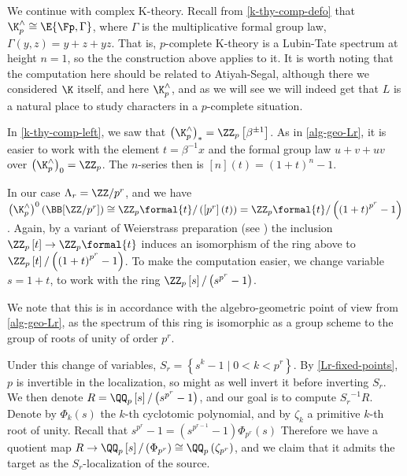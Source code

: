 \begin{example}\label{k-thy-Lr}
	We continue with complex K-theory.
	Recall from \ref{k-thy-comp-defo} that $\K_p^\wedge \cong \E{\Fp, \Gamma}$, where $\Gamma$ is the multiplicative formal group law, $\Gamma\left(y,z\right) = y + z + yz$.
	That is, $p$-complete K-theory is a Lubin-Tate spectrum at height $n = 1$, so the the construction above applies to it.
	It is worth noting that the computation here should be related to Atiyah-Segal, although there we considered $\K$ itself, and here $\K_p^\wedge$, and as we will see we will indeed get that $L$ is a natural place to study characters in a $p$-complete situation.
	
	In \ref{k-thy-comp-left}, we saw that $\left(\K_p^\wedge\right)_* = \ZZ_p\left[\beta^{\pm 1}\right]$.
	As in \ref{alg-geo-Lr}, it is easier to work with the element $t = \beta^{-1} x$ and the formal group law $u + v + uv$ over $\left(\K_p^\wedge\right)_0 = \ZZ_p$.
	The $n$-series then is $\left[n\right]\left(t\right) = \left(1 + t\right)^n - 1$.
	
	In our case $\Lambda_r = \ZZ/p^r$, and we have
	$
	\left(\K_p^\wedge\right)^0\left(\BB[\ZZ/p^r]\right)
	\cong \ZZ_p\formal{t}/\left(\left[p^r\right]\left(t\right)\right)
	= \ZZ_p\formal{t}/\left(\left(1 + t\right)^{p^r} - 1\right)
	$.
	Again, by a variant of Weierstrass preparation (see \cite[5.1]{HKR}) the inclusion $\ZZ_p\left[t\right] \to \ZZ_p\formal{t}$ induces an isomorphism of the ring above to 	$\ZZ_p\left[t\right]/\left(\left(1 + t\right)^{p^r} - 1\right)$.
	To make the computation easier, we change variable $s = 1+t$, to work with the ring
	$\ZZ_p\left[s\right]/\left(s^{p^r} - 1\right)$.
	
	We note that this is in accordance with the algebro-geometric point of view from \ref{alg-geo-Lr}, as the spectrum of this ring is isomorphic as a group scheme to the group of roots of unity of order $p^r$.
	
	Under this change of variables, $S_r = \left\{s^k - 1 \mid 0 < k < p^r\right\}$.
	By \ref{Lr-fixed-points}, $p$ is invertible in the localization, so might as well invert it before inverting $S_r$.
	We then denote $R = \QQ_p\left[s\right]/\left(s^{p^r} - 1\right)$, and our goal is to compute ${S_r}^{-1} R$.
	Denote by $\Phi_k\left(s\right)$ the $k$-th cyclotomic polynomial, and by $\zeta_k$ a primitive $k$-th root of unity.
	Recall that $s^{p^r} - 1 = \left(s^{p^{r-1}} - 1\right) \Phi_{p^r}\left(s\right)$
	Therefore we have a quotient map $R \to \QQ_p\left[s\right]/\left(\Phi_{p^r}\right) \cong \QQ_p\left(\zeta_{p^r}\right)$, and we claim that it admits the target as the $S_r$-localization of the source.
	

\end{example}
